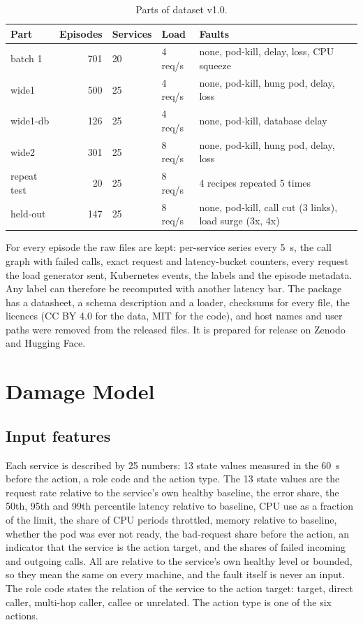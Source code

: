 \begin{table}[H]
\centering
\caption{Parts of dataset v1.0.}
\label{tab:parts}
\small
\begin{tabular}{@{}lrllp{5.2cm}@{}}
\toprule
Part & Episodes & Services & Load & Faults \\
\midrule
batch 1 & 701 & 20 & 4 req/s & none, pod-kill, delay, loss, CPU squeeze \\
wide1 & 500 & 25 & 4 req/s & none, pod-kill, hung pod, delay, loss \\
wide1-db & 126 & 25 & 4 req/s & none, pod-kill, database delay \\
wide2 & 301 & 25 & 8 req/s & none, pod-kill, hung pod, delay, loss \\
repeat test & 20 & 25 & 8 req/s & 4 recipes repeated 5 times \\
held-out & 147 & 25 & 8 req/s & none, pod-kill, call cut (3 links), load surge (3x, 4x) \\
\bottomrule
\end{tabular}
\end{table}

For every episode the raw files are kept: per-service series every 5~s, the call graph with failed calls, exact request and latency-bucket counters, every request the load generator sent, Kubernetes events, the labels and the episode metadata. Any label can therefore be recomputed with another latency bar. The package has a datasheet, a schema description and a loader, checksums for every file, the licences (CC BY 4.0 for the data, MIT for the code), and host names and user paths were removed from the released files. It is prepared for release on Zenodo and Hugging Face.

\section{Damage Model}
\subsection{Input features}
Each service is described by 25 numbers: 13 state values measured in the 60~s before the action, a role code and the action type. The 13 state values are the request rate relative to the service's own healthy baseline, the error share, the 50th, 95th and 99th percentile latency relative to baseline, CPU use as a fraction of the limit, the share of CPU periods throttled, memory relative to baseline, whether the pod was ever not ready, the bad-request share before the action, an indicator that the service is the action target, and the shares of failed incoming and outgoing calls. All are relative to the service's own healthy level or bounded, so they mean the same on every machine, and the fault itself is never an input. The role code states the relation of the service to the action target: target, direct caller, multi-hop caller, callee or unrelated. The action type is one of the six actions.

